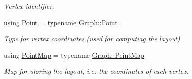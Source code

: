 \begin{DoxyCompactItemize}
\begin{DoxyCompactList}\small\item\em Vertex identifier. \end{DoxyCompactList}\item 
using \hyperlink{structslb_1_1core_1_1ui_1_1Drawer_a77e84b439de5aa745cea48b184f060ec}{Point} = typename \hyperlink{structslb_1_1core_1_1ui_1_1StateGraph_a86d2316b03ddf9f3da4d6255d20a39d8}{Graph\+::\+Point}\hypertarget{structslb_1_1core_1_1ui_1_1Drawer_a77e84b439de5aa745cea48b184f060ec}{}\label{structslb_1_1core_1_1ui_1_1Drawer_a77e84b439de5aa745cea48b184f060ec}

\begin{DoxyCompactList}\small\item\em Type for vertex coordinates (used for computing the layout) \end{DoxyCompactList}\item 
using \hyperlink{structslb_1_1core_1_1ui_1_1Drawer_a5d8ae089b9b1f95a780bb1b0ef7d05e6}{Point\+Map} = typename \hyperlink{structslb_1_1core_1_1ui_1_1StateGraph_abc09edc649d6690817cb6219e3feefb0}{Graph\+::\+Point\+Map}\hypertarget{structslb_1_1core_1_1ui_1_1Drawer_a5d8ae089b9b1f95a780bb1b0ef7d05e6}{}\label{structslb_1_1core_1_1ui_1_1Drawer_a5d8ae089b9b1f95a780bb1b0ef7d05e6}

\begin{DoxyCompactList}\small\item\em Map for storing the layout, i.\+e. the coordinates of each vertex. \end{DoxyCompactList}\end{DoxyCompactItemize}
